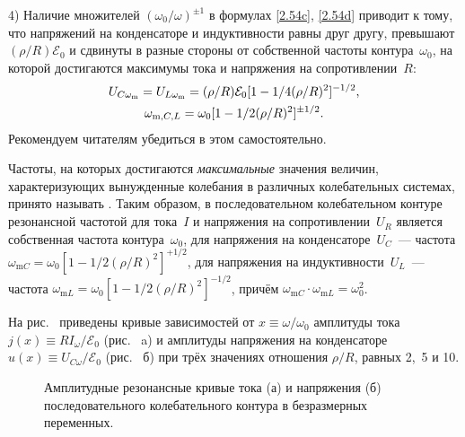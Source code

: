 \documentclass[a4paper,oneside]{book}
\begin{document}
4) Наличие множителей $(\omega_0 / \omega)^{\pm 1}$ в формулах \eqref{2.54c}, \eqref{2.54d} приводит к тому,
что  напряжений на конденсаторе и индуктивности равны друг
другу, превышают $(\rho/R)\mathcal{E}_0$ и сдвинуты в разные стороны от
собственной частоты контура~$\omega_0$, на которой достигаются максимумы тока и
напряжения на сопротивлении~$R$:
\begin{equation}
	\eqmark{2.57}
	\begin{gathered}[c]
U_{C\omega_\text{m}}=U_{L\omega_\text{m}}=(\rho/R)\mathcal{E}_0[1-1/4(\rho/R)^2]
^{-1/2},\\
		\omega_{\text{m},C,L}=\omega_0[1-1/2(\rho/R)^2]^{\pm1/2}.
	\end{gathered}
\end{equation}
Рекомендуем читателям убедиться в этом самостоятельно.

Частоты, на которых достигаются \emph{максимальные} значения величин,
характеризующих вынужденные колебания в различных колебательных системах,
принято называть . Таким образом, в последовательном
колебательном контуре резонансной частотой для тока~$I$ и напряжения на
сопротивлении~$U_R$ является собственная частота контура~$\omega_0$, для
напряжения на конденсаторе~$U_C$~--- частота
$\omega_{\text{m}C}=\omega_0[1-1/2(\rho/R)^2]^{+1/2}$, для напряжения на
индуктивности~$U_L$~--- частота
$\omega_{\text{m}L}=\omega_0[1-1/2(\rho/R)^2]^{-1/2}$, причём
$\omega_{\text{m}C}\cdot\omega_{\text{m}L}=\omega_0^2$.

На рис.~ приведены  кривые
зависимостей от $x\equiv\omega/\omega_0$ амплитуды тока $j(x)\equiv
RI_\omega/\mathcal{E}_0$ (рис.~ a) и амплитуды напряжения на
конденсаторе $u(x)\equiv U_{C\omega}/\mathcal{E}_0$  (рис.~ б) при
трёх значениях отношения $\rho/R$, равных 2,~5 и 10.
\begin{figure}[h]
		\begin{minipage}[h]{0.5\linewidth}
		\end{minipage}
		\hfill
		\begin{minipage}[h]{0.5\linewidth}
		\end{minipage}
		\caption{Амплитудные резонансные кривые тока (а) и напряжения (б) последовательного колебательного контура в безразмерных переменных.}
\end{figure}
\end{document}
